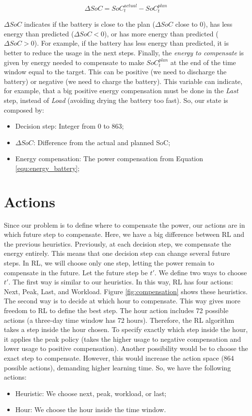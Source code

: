\begin{equation}
    \Delta SoC = SoC^{actual}_{t} - SoC^{plan}_{t}
\end{equation}

$\Delta SoC$ indicates if the battery is close to the plan ($\Delta SoC$ close to 0), has less energy than predicted ($\Delta SoC < 0$), or has more energy than predicted ($\Delta SoC > 0$). For example, if the battery has less energy than predicted, it is better to reduce the usage in the next steps. Finally, the \textit{energy to compensate} is given by energy needed to compensate to make $SoC^{plan}_{t}$ at the end of the time window equal to the target. This can be positive (we need to discharge the battery) or negative (we need to charge the battery). This variable can indicate, for example, that a big positive energy compensation must be done in the \emph{Last} step, instead of \emph{Load} (avoiding drying the battery too fast). So, our state is composed by:

\begin{itemize}
    \item Decision step: Integer from 0 to 863;
    \item \(\Delta SoC\): Difference from the actual and planned SoC;
    \item Energy compensation: The power compensation from Equation \ref{equ:energy_battery};
\end{itemize}

\section{Actions}

Since our problem is to define where to compensate the power, our actions are in which future step to compensate. Here, we have a big difference between RL and the previous heuristics. Previously, at each decision step, we compensate the energy entirely. This means that one decision step can change several future steps. In RL, we will choose only one step, letting the power remain to compensate in the future. Let the future step be $t'$. We define two ways to choose $t'$. The first way is similar to our heuristics. In this way, RL has four actions: Next, Peak, Last, and Workload. Figure \ref{fig:compensation} shows these heuristics. The second way is to decide at which hour to compensate. This way gives more freedom to RL to define the best step. The hour action includes 72 possible actions (a three-day time window has 72 hours). Therefore, the RL algorithm takes a step inside the hour chosen. To specify exactly which step inside the hour, it applies the peak policy (takes the higher usage to negative compensation and lower usage to positive compensation). Another possibility would be to choose the exact step to compensate. However, this would increase the action space (864 possible actions), demanding higher learning time. So, we have the following actions:
\begin{itemize}
    \item Heuristic: We choose next, peak, workload, or last;
    \item Hour: We choose the hour inside the time window.
\end{itemize}

